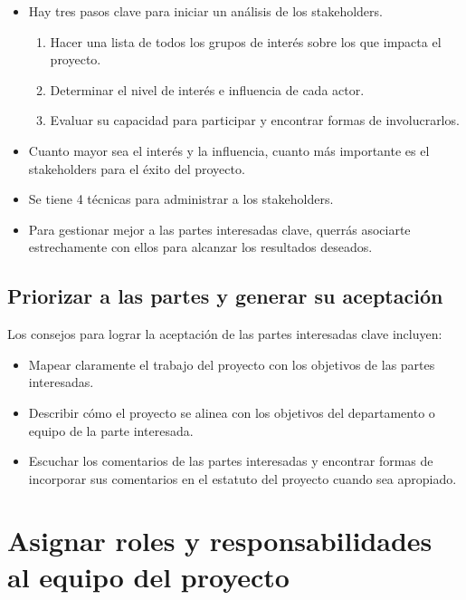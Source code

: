 \documentclass[10pt]{book}
\begin{document}
	\begin{itemize}

	    \item Hay tres pasos clave para iniciar un análisis de los stakeholders.

	    \begin{enumerate}[1.]
		\item Hacer una lista de todos los grupos de interés sobre los que impacta el proyecto.
		\item Determinar el nivel de interés e influencia de cada actor.
		\item Evaluar su capacidad para participar y encontrar formas de involucrarlos.
	    \end{enumerate}

	    \item Cuanto mayor sea el interés y la influencia, cuanto más importante es el stakeholders para el éxito del proyecto.
	    \item Se tiene 4 técnicas para administrar a los stakeholders.
	    \item Para gestionar mejor a las partes interesadas clave, querrás asociarte estrechamente con ellos para alcanzar los resultados deseados.\\

	\end{itemize}

	\subsection{Priorizar a las partes y generar su aceptación}
	Los consejos para lograr la aceptación de las partes interesadas clave incluyen: 

	\begin{itemize}
	    \item  Mapear claramente el trabajo del proyecto con los objetivos de las partes interesadas.
	    \item Describir cómo el proyecto se alinea con los objetivos del departamento o equipo de la parte interesada.
	    \item Escuchar los comentarios de las partes interesadas y encontrar formas de incorporar sus comentarios en el estatuto del proyecto cuando sea apropiado.
	\end{itemize}

    \section{Asignar roles y responsabilidades al equipo del proyecto}
\end{document}
